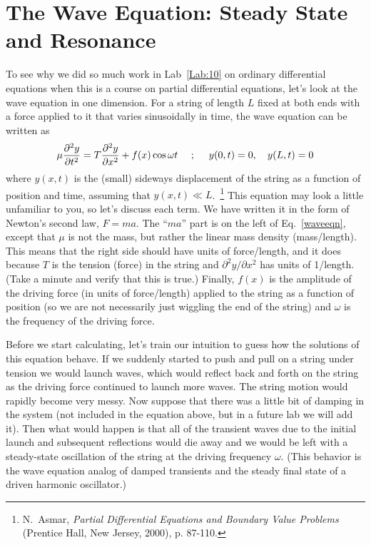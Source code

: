 \chapter{The Wave Equation: Steady State and Resonance}
\label{Lab:11}

To see why we did so much work in Lab~\ref{Lab:10} on ordinary
differential equations when this is a course on partial differential
equations, let's look at the wave equation in one dimension. For a
string of length $L$ fixed at both ends with a force applied to it
that varies sinusoidally in time, the wave equation can be written as
\begin{equation} \label{waveeqn}
    \mu {\partial^2 y \over \partial t^2}
    = T {\partial^2 y \over \partial x^2} + f(x) \cos{\omega t}~~~~;
    ~~~~y(0,t)=0,~~~y(L,t)=0
\end{equation}
where $y(x,t)$ is the (small) sideways displacement of the string as
a function of position and time, assuming that $y(x,t) \ll L$.\
\footnote{N.\ Asmar, {\it Partial Differential Equations and Boundary
Value Problems} (Prentice Hall, New Jersey, 2000), p. 87-110.} This
equation may look a little unfamiliar to you, so let's discuss each
term. We have written it in the form of Newton's second law, $F=ma$.
The  ``$ma$'' part is on the left of Eq.~\eqref{waveeqn}, except that
$\mu$ is not the mass, but rather the linear mass density
(mass/length). This means that the right side should have units of
force/length, and it does because $T$ is the tension (force) in the
string and $\partial^2 y / \partial x^2$ has units of 1/length. (Take
a minute and verify that this is true.) Finally, $f(x)$ is the
amplitude of the driving force (in units of force/length) applied to
the string as a function of position (so we are not necessarily just
wiggling the end of the string) and $\omega$ is the frequency of the
driving force.

Before we start calculating, let's train our intuition to guess how
the solutions of this equation behave. If we suddenly started to push
and pull on a string under tension we would launch waves, which would
reflect back and forth on the string as the driving force continued
to launch more waves. The string motion would rapidly become very
messy. Now suppose that there was a little bit of damping in the
system (not included in the equation above, but in a future lab we
will add it). Then what would happen is that all of the transient
waves due to the initial launch and subsequent reflections would die
away and we would be left with a steady-state oscillation of the
string at the driving frequency $\omega$. (This behavior is the wave
equation analog of damped transients and the steady final state of a
driven harmonic oscillator.) \index{Damped transients}

